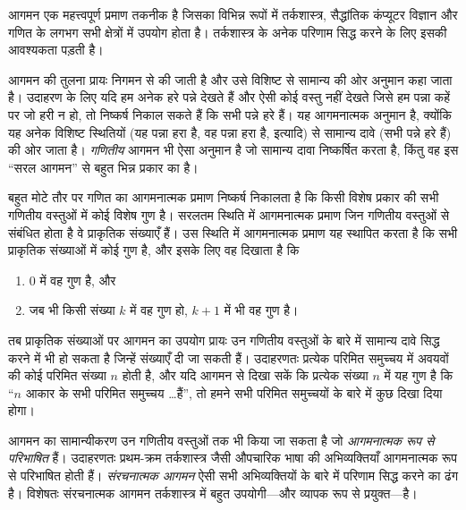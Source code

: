 \documentclass[../../../include/open-logic-section]{subfiles}
\begin{document}


आगमन एक महत्त्वपूर्ण प्रमाण तकनीक है जिसका विभिन्न रूपों में तर्कशास्त्र,
सैद्धांतिक कंप्यूटर विज्ञान और गणित के लगभग सभी क्षेत्रों में उपयोग होता
है। तर्कशास्त्र के अनेक परिणाम सिद्ध करने के लिए इसकी आवश्यकता पड़ती है।

आगमन की तुलना प्रायः निगमन से की जाती है और उसे विशिष्ट से सामान्य की ओर
अनुमान कहा जाता है। उदाहरण के लिए यदि हम अनेक हरे पन्ने देखते हैं और ऐसी
कोई वस्तु नहीं देखते जिसे हम पन्ना कहें पर जो हरी न हो, तो निष्कर्ष निकाल
सकते हैं कि सभी पन्ने हरे हैं। यह आगमनात्मक अनुमान है, क्योंकि यह अनेक
विशिष्ट स्थितियों (यह पन्ना हरा है, वह पन्ना हरा है, इत्यादि) से सामान्य
दावे (सभी पन्ने हरे हैं) की ओर जाता है। \emph{गणितीय} आगमन भी ऐसा अनुमान है
जो सामान्य दावा निष्कर्षित करता है, किंतु वह इस ``सरल आगमन'' से बहुत भिन्न
प्रकार का है।

बहुत मोटे तौर पर गणित का आगमनात्मक प्रमाण निष्कर्ष निकालता है कि किसी
विशेष प्रकार की सभी गणितीय वस्तुओं में कोई विशेष गुण है। सरलतम स्थिति में
आगमनात्मक प्रमाण जिन गणितीय वस्तुओं से संबंधित होता है वे प्राकृतिक संख्याएँ
हैं। उस स्थिति में आगमनात्मक प्रमाण यह स्थापित करता है कि सभी प्राकृतिक
संख्याओं में कोई गुण है, और इसके लिए वह दिखाता है कि
\begin{enumerate}
    \item $0$ में वह गुण है, और
    \item जब भी किसी संख्या $k$ में वह गुण हो, $k+1$ में भी वह गुण है।
\end{enumerate}
तब प्राकृतिक संख्याओं पर आगमन का उपयोग प्रायः उन गणितीय वस्तुओं के बारे में
सामान्य दावे सिद्ध करने में भी हो सकता है जिन्हें संख्याएँ दी जा सकती हैं।
उदाहरणतः प्रत्येक परिमित समुच्चय में अवयवों की कोई परिमित संख्या $n$ होती
है, और यदि आगमन से दिखा सकें कि प्रत्येक संख्या $n$ में यह गुण है कि
``$n$ आकार के सभी परिमित समुच्चय \dots हैं'', तो हमने सभी परिमित समुच्चयों
के बारे में कुछ दिखा दिया होगा।

आगमन का सामान्यीकरण उन गणितीय वस्तुओं तक भी किया जा सकता है जो
\emph{आगमनात्मक रूप से परिभाषित} हैं। उदाहरणतः प्रथम-क्रम तर्कशास्त्र जैसी
औपचारिक भाषा की अभिव्यक्तियाँ आगमनात्मक रूप से परिभाषित होती हैं।
\emph{संरचनात्मक आगमन} ऐसी सभी अभिव्यक्तियों के बारे में परिणाम सिद्ध करने
का ढंग है। विशेषतः संरचनात्मक आगमन तर्कशास्त्र में बहुत उपयोगी---और व्यापक
रूप से प्रयुक्त---है।
\end{document}
